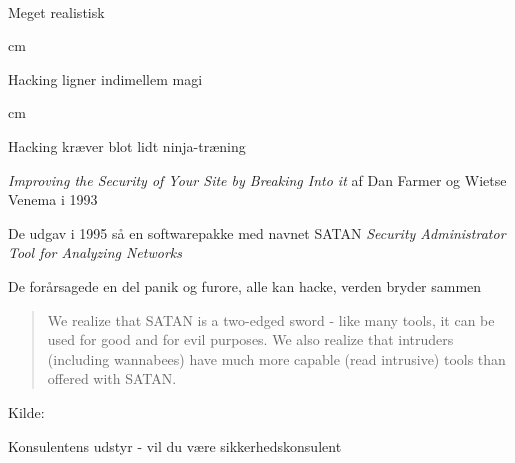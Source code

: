 \documentclass[20pt,landscape,a4paper]{foils}
\begin{document}




\\
Meget realistisk 





 cm

\centerline{Hacking ligner indimellem  magi}




 cm
\centerline{Hacking kræver blot lidt ninja-træning}



\begin{list1}
\item \emph{Improving the Security of Your Site by Breaking Into it} af
Dan Farmer og Wietse Venema i 1993
\item De udgav i 1995 så en softwarepakke med navnet SATAN
\emph{Security Administrator Tool for Analyzing Networks}
\item De forårsagede en del panik og furore, alle kan hacke, verden bryder sammen

\vskip 1cm
\begin{quote}
We realize that SATAN is a two-edged sword - like
many tools, it can be used for good and for evil
purposes. We also realize that intruders (including
wannabees) have much more capable (read intrusive)
tools than offered with SATAN.
\end{quote}
\end{list1}

\vskip 1cm
Kilde:



\centerline{Konsulentens udstyr - vil du være sikkerhedskonsulent}
\end{document}
